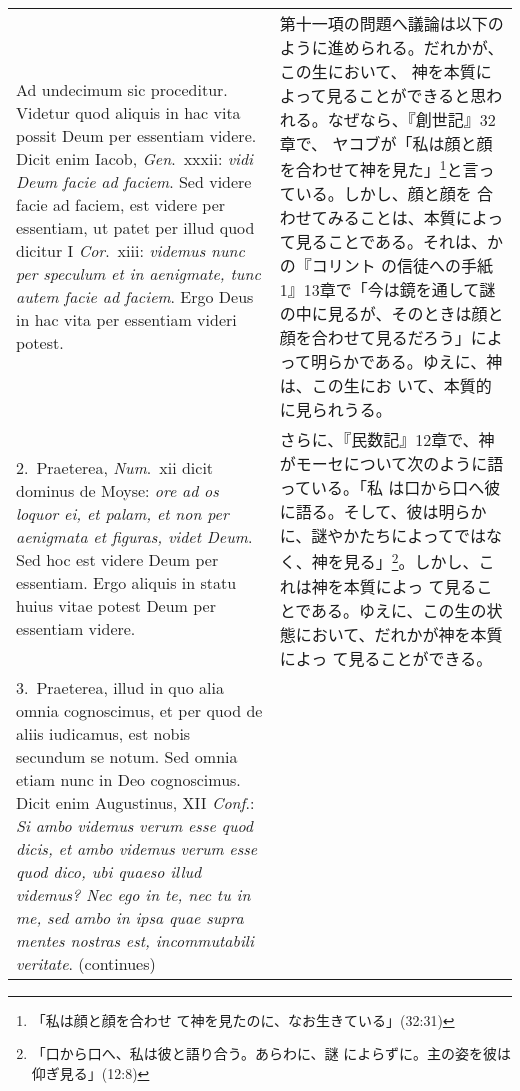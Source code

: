 \documentclass[10pt]{jsarticle} %
\begin{document}
\begin{longtable}{p{21em}p{21em}}


{\sc  Ad undecimum sic proceditur}. Videtur quod aliquis in hac
 vita possit Deum per essentiam videre. Dicit enim Iacob, {\it
 Gen}.~{\sc xxxii}:
 {\it vidi Deum facie ad faciem}. Sed videre facie ad faciem, est videre per
 essentiam, ut patet per illud quod dicitur I {\it Cor}.~{\sc xiii}:
 {\it videmus nunc
 per speculum et in aenigmate, tunc autem facie ad faciem}. Ergo Deus in
 hac vita per essentiam videri potest.


&

第十一項の問題へ議論は以下のように進められる。だれかが、この生において、
神を本質によって見ることができると思われる。なぜなら、『創世記』32章で、
ヤコブが「私は顔と顔を合わせて神を見た」\footnote{「私は顔と顔を合わせ
て神を見たのに、なお生きている」(32:31)}と言っている。しかし、顔と顔を
合わせてみることは、本質によって見ることである。それは、かの『コリント
の信徒への手紙1』13章で「今は鏡を通して謎の中に見るが、そのときは顔と
顔を合わせて見るだろう」によって明らかである。ゆえに、神は、この生にお
いて、本質的に見られうる。

\\




2.~{\sc  Praeterea}, {\it Num}.~{\sc xii} dicit dominus de Moyse:
 {\it ore ad os
 loquor ei, et palam, et non per aenigmata et figuras, videt Deum}. Sed
 hoc est videre Deum per essentiam. Ergo aliquis in statu huius vitae
 potest Deum per essentiam videre.


&

さらに、『民数記』12章で、神がモーセについて次のように語っている。「私
 は口から口へ彼に語る。そして、彼は明らかに、謎やかたちによってではな
 く、神を見る」\footnote{「口から口へ、私は彼と語り合う。あらわに、謎
 によらずに。主の姿を彼は仰ぎ見る」(12:8)}。しかし、これは神を本質によっ
 て見ることである。ゆえに、この生の状態において、だれかが神を本質によっ
 て見ることができる。

\\




3.~{\sc  Praeterea}, illud in quo alia omnia cognoscimus, et per
 quod de aliis iudicamus, est nobis secundum se notum. Sed omnia etiam
 nunc in Deo cognoscimus. Dicit enim Augustinus, XII {\it Conf}.: {\it Si ambo
 videmus verum esse quod dicis, et ambo videmus verum esse quod dico,
 ubi quaeso illud videmus? Nec ego in te, nec tu in me, sed ambo in ipsa
 quae supra mentes nostras est, incommutabili veritate}. (continues)


\end{longtable}
\end{document}
